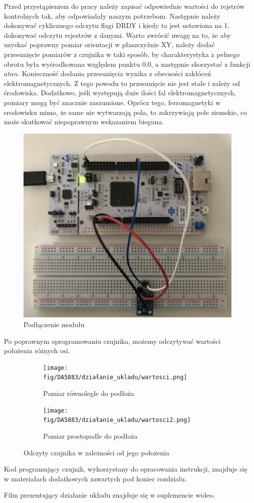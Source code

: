 \documentclass[11pt, a4paper]{article}
\begin{document}
Przed przystąpieniem do pracy należy zapisać odpowiednie wartości do rejstrów kontrolnych tak, aby odpowiadały naszym potrzebom. Następnie należy dokonywać cyklicznego odczytu flagi DRDY i kiedy ta jest ustawiona na 1, dokonywać odczytu rejestrów z danymi. Warto zwrócić uwagę na to, że aby uzyskać poprawny pomiar orientacji w płaszczyźnie XY, należy dodać przesunięcie pomiarów z czujnika w taki sposób, by charakterystyka z pełnego obrotu była wyśrodkowana względem punktu 0.0, a następnie skorzystać z funkcji $atan$. Konieczność dodania przesunięcia wynika z obecności zakłóceń elektromagnetycznych. Z tego powodu to przesunięcie nie jest stałe i zależy od środowiska. Dodatkowo, jeśli występują duże ilości fal elektromagnetycznych, pomiary mogą być znacznie zaszumione. Oprócz tego, ferromagnetyki w srodowisku mimo, że same nie wytwarzają pola, to zakrzywiają pole ziemskie, co może skutkować niepoprawnym wskazaniem bieguna.
\vspace{0.5cm}
\begin{figure}[h!]
    \centering
    \includegraphics[width=.6\textwidth]{fig/DA5883/polaczenie_modulu/uklad.jpg}
    \caption{Podłączenie modułu}
    \label{fig:my_label}
\end{figure}
\newline
Po poprawnym oprogramowaniu czujnika, możemy odczytywać wartości położenia różnych osi.
\begin{figure}[h!]
\centering
\begin{subfigure}{.5\textwidth}
  \centering
  \texttt{[image: fig/DA5883/działanie\_ukladu/wartosci.png]}
  \caption{Pomiar równolegle do podłoża}
  \label{fig:sub1}
\end{subfigure}%
\begin{subfigure}{.5\textwidth}
  \centering
  \texttt{[image: fig/DA5883/działanie\_ukladu/wartosci2.png]}
  \caption{Pomiar prostopadle do podłoża}
  \label{fig:sub2}
\end{subfigure}
\caption{Odczyty czujnika w zależności od jego położenia}
\label{fig:test}
\end{figure}
\newline
Kod programujący czujnik, wykorzystany do opracowania instrukcji, znajduje się w materiałach dodatkowych zawartych pod koniec rozdziału.
\newline

Film prezentujący działanie układu znajduje się w suplemencie wideo.
\printbibliography[heading=bibintoc]
\end{document}
